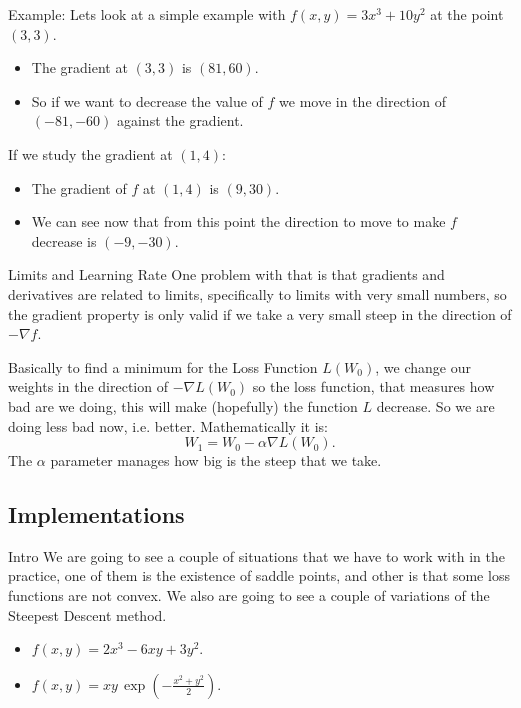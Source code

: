 \documentclass[presentation]{beamer}
\begin{document}
\begin{frame}[label={sec:orgf4bb303}]{Example:}
Lets look at a simple example with \(f(x,y) = 3x^3 + 10y^2\) at the point \((3, 3)\).

\begin{itemize}
\item The gradient at \((3,3)\) is \((81, 60)\).
\item So if we want to decrease the value of \(f\) we move in the direction of \((-81, -60)\) against the gradient.
\end{itemize}

If we study the gradient at \((1, 4)\):

\begin{itemize}
\item The gradient of \(f\) at \((1,4)\) is \((9, 30)\).
\item We can see now that from this point the direction to move to make \(f\) decrease is \((-9, -30)\).
\end{itemize}
\end{frame}


\begin{frame}[label={sec:org87e629a}]{Limits and Learning Rate}
One problem with that is that gradients and derivatives are related to limits, specifically to limits with very small numbers, so the gradient property is only valid if we take a very small steep in the direction of \(-\nabla f\).

Basically to find a minimum for the \alert{Loss Function} \(L(W_0)\), we change our weights in the direction of \(-\nabla L(W_0)\) so the loss function, that measures how bad are we doing, this will make (hopefully) the function \(L\) decrease. So we are doing less bad now, i.e. better. Mathematically it is:
\[
   W_1 = W_0 - \alpha \nabla L(W_0).
\]
The \(\alpha\) parameter manages how big is the steep that we take.
\end{frame}


\subsection{Implementations}
\label{sec:org4c22986}

\begin{frame}[label={sec:org7d291fd}]{Intro}
We are going to see a couple of situations that we have to work with in the practice, one of them is the existence of saddle points, and other is that some loss functions are not convex. We also are going to see a couple of variations of the Steepest Descent method.

\begin{itemize}
\item \(\displaystyle f(x,y) = 2x^3- 6xy + 3y^2\).
\item \(\displaystyle f(x,y) = xy \, \exp \left( -\frac{x^2+y^2}{2} \right)\).
\end{itemize}
\end{frame}
\end{document}
